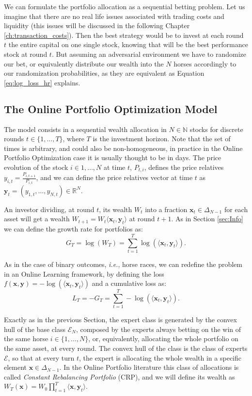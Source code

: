 We can formulate the portfolio allocation as a sequential betting problem. Let us imagine that there are no real life issues associated with trading costs and liquidity (this issues will be discussed in the following Chapter \ref{ch:transaction_costs}). Then the best strategy would be to invest at each round $t$ the entire capital on one single stock, knowing that will be the best performance stock at round $t$. But assuming an adversarial environment we have to randomize our bet, or equivalently distribute our wealth into the $N$ horses accordingly to our randomization probabilities, as they are equivalent as Equation \eqref{eq:log_loss_hr} explains. 

\subsection{The Online Portfolio Optimization Model}

The model consists in a sequential wealth allocation in $N\in\mathbb N$ stocks for discrete rounds $t\in\{1,\ldots,T\}$, where $T$ is the investment horizon. Note that the set of times is arbitrary, and could also be non-homogeneous, in practice in the Online Portfolio Optimization case it is usually thought to be in days. The price evolution of the stock $i\in 1,\ldots,N$ at time $t$, $P_{t,i}$, defines the price relatives $y_{i,t}=\frac{P_{i,t+1}}{P_{i,t}}$, and we can define the price relatives vector at time $t$ as $\mathbf y_t=(y_{1,t},\ldots,y_{N,t})\in\mathbb R^N$. 

An investor dividing, at round $t$, its wealth $W_t$ into a fraction $\mathbf x_t\in\Delta_{N-1}$ for each asset will get a wealth $W_{t+1}=W_t\langle \mathbf x_t,\mathbf y_t\rangle$ at round $t+1$. As in Section \ref{sec:Info} we can define the growth rate for portfolios as:
$$G_T=\log(W_T)=\sum\limits_{t=1}^T\log(\langle\mathbf x_t, \mathbf y_t\rangle).$$

As in the case of binary outcomes, \emph{i.e.}, horse races, we can redefine the problem in an Online Learning framework, by defining the loss $f(\mathbf x,\mathbf y)=-\log(\langle\mathbf x_t, \mathbf y_t\rangle)$ and a cumulative loss as: 
$$L_T=-G_T=\sum\limits_{t=1}^T-\log(\langle\mathbf x_t,\mathbf y_t\rangle).$$

Exactly as in the previous Section, the expert class is generated by the convex hull of the base class $\mathcal E_N$, composed by the experts always betting on the win of the same horse $i\in\{1,\ldots,N\}$, or, equivalently, allocating the whole portfolio on the same asset, at every round. The convex hull of the class is the class of experts $\mathcal E$, so that at every turn $t$, the expert is allocating the whole wealth in a specific element $\mathbf x\in\Delta_{N-1}$. In the Online Portfolio literature this class of allocations is called \emph{Constant Rebalancing Portfolio} (CRP), and we will define its wealth as $W_T(\mathbf x)=W_0\prod\limits_{t=1}^T\langle\mathbf x,\mathbf y_t\rangle$.

